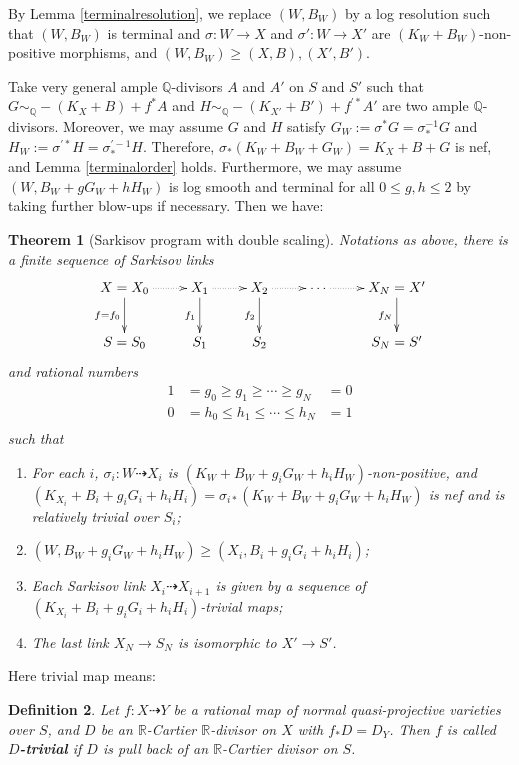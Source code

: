 \documentclass[11pt]{amsart}
\newtheorem{defn}{Definition}[section]
\newtheorem{thm}[defn]{Theorem}
\begin{document}
By Lemma \ref{terminalresolution}, we  replace $(W,B_W)$ by a log resolution such that $(W,B_{W})$ is terminal and $\sigma:W\to X$ and $\sigma':W\to X'$ are $(K_W+B_W)$-non-positive morphisms, and $(W,B_W)\geqslant (X,B),(X',B')$.

Take  very general ample $\mathbb{Q}$-divisors $ A $ and $ A' $ on $ S $ and $ S' $ such that $ G\sim_{\mathbb{Q}}-(K_X+B)+f^*A $ and $ H\sim_{\mathbb{Q}}-(K_{X'}+B')+f^{'*}A' $ are two ample $\mathbb{Q}$-divisors. Moreover, we may assume $ G $ and $ H $ satisfy $G_{W}:= \sigma^*G=\sigma^{-1}_*G $ and $ H_{W}:=\sigma^{'*}H=\sigma^{'-1}_*H $. Therefore, $\sigma_{*}(K_{W}+B_{W}+G_{W})=K_{X}+B+G$ is nef, and Lemma \ref{terminalorder} holds.
Furthermore, we may assume $(W, B_W+gG_W+hH_W)$ is log smooth and terminal for all $0\leqslant g,h\leqslant 2$ by taking further blow-ups if necessary.
Then we have:
\begin{thm}[Sarkisov program with double scaling]\label{main2}
  \cite[Claim 13.12]{haconMinimalModelProgram2012}
  Notations as above, there is a finite sequence of Sarkisov links
  \[
    \xymatrix{
    X=X_0\ar@{.>}[r]\ar[d]_{f=f_{0}}&X_{1}\ar@{.>}[r]\ar[d]_{f_{1}}& X_{2}\ar[d]_{f_{2}}\ar@{.>}[r] &\cdots\ar@{.>}[r]&X_N=X'\ar[d]_{f_{N}} \\
    S=S_{0}&S_{1} &S_{2}&&S_N=S'
    }
  \]
  and rational numbers
  \[
    \begin{aligned}
      1 & =g_0\geqslant g_1 \geqslant \cdots \geqslant g_N   & =0 \\
      0 & =h_0\leqslant h_{1} \leqslant \cdots \leqslant h_N & =1 \\
    \end{aligned}
  \]
  such that
  \begin{enumerate}
    \item For each $i$, $\sigma_i:W\dashrightarrow  X_{i}$ is $(K_{W}+B_{W}+g_{i}G_{W}+h_{i}H_{W})$-non-positive, and $(K_{X_{i}}+B_{i}+g_{i}G_{i}+h_{i}H_{i})=\sigma_{i*}(K_{W}+B_{W}+g_{i}G_{W}+h_{i}H_{W})$ is nef and is relatively trivial over $S_{i}$;
    \item $(W,B_{W}+g_{i}G_{W}+h_{i}H_{W})\geqslant (X_{i},B_{i}+g_{i}G_{i}+h_{i}H_{i})$;
    \item Each Sarkisov link $X_{i}\dashrightarrow X_{i+1}$ is given by a sequence of $(K_{X_{i}}+B_{i}+g_{i}G_{i}+h_{i}H_{i})$-trivial maps;
    \item  The last link $X_{N} \to S_{N}$ is isomorphic to $X'\to S'$.
  \end{enumerate}
\end{thm}
Here trivial map means:
\begin{defn}\label{rivialmap}
  \cite[\S 13.2]{haconMinimalModelProgram2012} Let $f:X\dashrightarrow Y$ be a rational map of normal quasi-projective varieties over $S$, and $D$ be an $\mathbb{R}$-Cartier $\mathbb{R}$-divisor  on $X$ with $f_*D=D_Y$. Then $f$ is called \textbf{$D$-trivial} if $D$ is pull back of an $\mathbb{R}$-Cartier divisor on $S$.
\end{defn}
\end{document}
